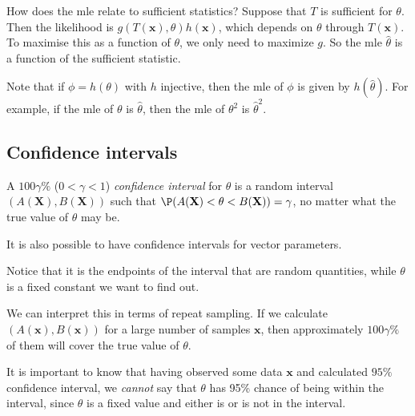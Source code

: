 \documentclass[a4paper]{article}
\begin{document}
How does the mle relate to sufficient statistics? Suppose that $T$ is sufficient for $\theta$. Then the likelihood is $g(T(\mathbf{x}), \theta)h(\mathbf{x})$, which depends on $\theta$ through $T(\mathbf{x})$. To maximise this as a function of $\theta$, we only need to maximize $g$. So the mle $\hat{\theta}$ is a function of the sufficient statistic.

Note that if $\phi = h(\theta)$ with $h$ injective, then the mle of $\phi$ is given by $h(\hat{\theta})$. For example, if the mle of $\theta$ is $\hat{\theta}$, then the mle of $\theta^2$ is $\hat{\theta}^2$.

\subsection{Confidence intervals}
\begin{defi}
  A $100\gamma\%$ ($0 < \gamma < 1$) \emph{confidence interval} for $\theta$ is a random interval $(A(\mathbf{X}), B(\mathbf{X}))$ such that $\P(A(\mathbf{X}) < \theta < B(\mathbf{X})) = \gamma$, no matter what the true value of $\theta$ may be.
\end{defi}
It is also possible to have confidence intervals for vector parameters.

Notice that it is the endpoints of the interval that are random quantities, while $\theta$ is a fixed constant we want to find out.

We can interpret this in terms of repeat sampling. If we calculate $(A(\mathbf{x}), B(\mathbf{x}))$ for a large number of samples $\mathbf{x}$, then approximately $100\gamma\%$ of them will cover the true value of $\theta$.

It is important to know that having observed some data $\mathbf{x}$ and calculated $95\%$ confidence interval, we \emph{cannot} say that $\theta$ has 95\% chance of being within the interval, since $\theta$ is a fixed value and either is or is not in the interval.
\end{document}
